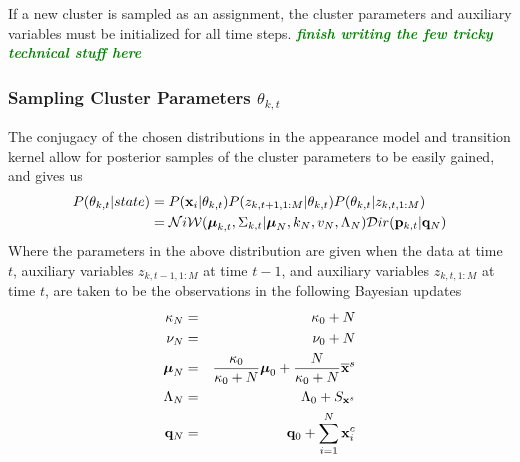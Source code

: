 \documentclass[smallcondensed, final]{svjour3}
\newcommand{\willie}[1]{\textcolor{green}{\textsf{\emph{\textbf{\textcolor{green}{#1}}}}}}
\begin{document}
If a new cluster is sampled as an assignment, the cluster parameters and auxiliary variables must be initialized for all time steps. \willie{finish writing the few tricky technical stuff here}







\subsubsection{Sampling Cluster Parameters $\theta_{k, t}$}
The conjugacy of the chosen distributions in the appearance model and transition kernel allow for posterior samples of the cluster parameters to be easily gained, and gives us
\begin{align}
\begin{split}
P(\theta_{k,t} | state) & = P(\bold{x}_{i} | \theta_{k,t}) P(z_{k,t+1,1:M} | \theta_{k,t})  P(\theta_{k,t} | z_{k,t,1:M}) \\
 & = \mathcal{N}i\mathcal{W}(\boldsymbol{\mu}_{k,t}, \Sigma_{k,t} | \boldsymbol{\mu}_{N}, k_{N}, v_{N}, \Lambda_{N})  \mathcal{D}ir( \bold{p}_{k,t} | \bold{q}_{N})
\end{split}
\end{align}
Where the parameters in the above distribution are given when the data at time $t$, auxiliary variables $z_{k,t-1,1:M}$ at time $t-1$, and auxiliary variables $z_{k,t,1:M}$ at time $t$, are taken to be the observations in the following Bayesian updates
\begin{eqnarray}
\label{bayesian_update_1}
\kappa_{N} &=& \kappa_{0} + N \\
\label{bayesian_update_2}
\nu_{N} &=& \nu_{0} + N \\
\label{bayesian_update_3}
\boldsymbol{\mu}_{N} &=& \frac{\kappa_{0}}{\kappa_{0}+N} \boldsymbol{\mu}_{0}  +  \frac{N}{\kappa_{0}+N} \overline{\bold{x}}^{s}\\
\Lambda_{N} &=& \Lambda_{0} + S_{\bold{x}^{s}}\\
\label{bayesian_update_4}
\bold{q}_{N} &=& \bold{q}_{0} + \sum_{i=1}^{N} \bold{x}_{i}^{c}
\end{eqnarray}
\end{document}
